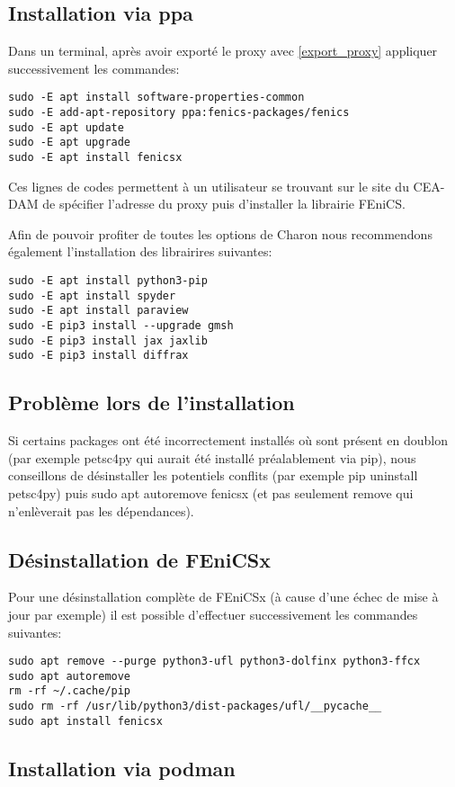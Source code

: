 \documentclass[10pt]{book}
\begin{document}
\subsection{Installation via ppa}\label{Subsection:ppa}
Dans un terminal, après avoir exporté le proxy avec \eqref{export_proxy} appliquer successivement les commandes:
\begin{verbatim}
sudo -E apt install software-properties-common
sudo -E add-apt-repository ppa:fenics-packages/fenics
sudo -E apt update
sudo -E apt upgrade
sudo -E apt install fenicsx
\end{verbatim}
Ces lignes de codes permettent à un utilisateur se trouvant sur le site du CEA-DAM de spécifier l'adresse du proxy puis d'installer la librairie FEniCS.

Afin de pouvoir profiter de toutes les options de Charon nous recommendons également l'installation des librairires suivantes:
\begin{verbatim}
sudo -E apt install python3-pip
sudo -E apt install spyder
sudo -E apt install paraview
sudo -E pip3 install --upgrade gmsh
sudo -E pip3 install jax jaxlib
sudo -E pip3 install diffrax
\end{verbatim}
\subsection{Problème lors de l'installation}
Si certains packages ont été incorrectement installés où sont présent en doublon (par exemple petsc4py qui aurait été installé préalablement via pip), nous conseillons de désinstaller les potentiels conflits (par exemple pip uninstall petsc4py) puis sudo apt autoremove fenicsx (et pas seulement remove qui n'enlèverait pas les dépendances).
\subsection{Désinstallation de FEniCSx}
Pour une désinstallation complète de FEniCSx (à cause d'une échec de mise à jour par exemple) il est possible d'effectuer successivement les commandes suivantes:
\begin{verbatim}
sudo apt remove --purge python3-ufl python3-dolfinx python3-ffcx
sudo apt autoremove
rm -rf ~/.cache/pip
sudo rm -rf /usr/lib/python3/dist-packages/ufl/__pycache__
sudo apt install fenicsx
\end{verbatim}
\subsection{Installation via podman}
\end{document}
